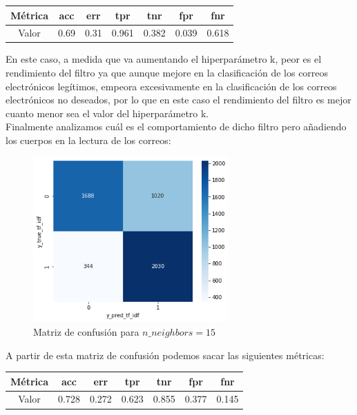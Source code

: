 \documentclass[conference,a4paper]{IEEEtran}
\begin{document}
\begin{center}
\begin{tabular}[h]{ |c|c|c|c|c|c|c| } 
 \hline
 Métrica & acc & err & tpr & tnr & fpr & fnr \\ 
 \hline
 Valor & 0.69 & 0.31 & 0.961 & 0.382 & 0.039 & 0.618 \\ 
 \hline
\end{tabular}
\end{center}

En este caso, a medida que va aumentando el hiperparámetro k, peor es el rendimiento del filtro ya que aunque mejore en la clasificación de los correos electrónicos legítimos, empeora excesivamente en la clasificación de los correos electrónicos no deseados, por lo que en este caso el rendimiento del filtro es mejor cuanto menor sea el valor del hiperparámetro k. \\

Finalmente analizamos cuál es el comportamiento de dicho filtro pero añadiendo los cuerpos en la lectura de los correos: \\

\begin{figure}[h]
  \centering
  \includegraphics[width=75mm]{knn_body_15}
  \caption{Matriz de confusión para $n\_neighbors=15$}
  \label{fig:ejemplo}
\end{figure}

A partir de esta matriz de confusión podemos sacar las siguientes métricas:

\begin{center}
\begin{tabular}{ |c|c|c|c|c|c|c| }
 \hline
 Métrica & acc & err & tpr & tnr & fpr & fnr \\ 
 \hline
 Valor & 0.728 & 0.272 & 0.623 & 0.855 & 0.377 & 0.145 \\ 
 \hline
\end{tabular}
\end{center}
\end{document}
